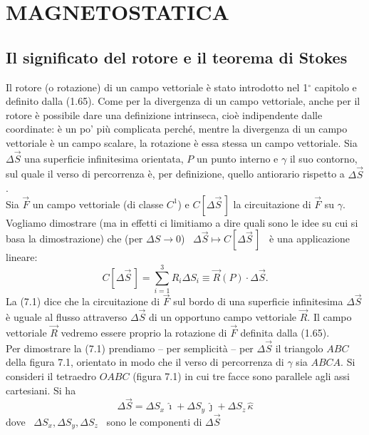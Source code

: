 \section{MAGNETOSTATICA}

\subsection{Il significato del rotore e il teorema di Stokes}

Il rotore (o rotazione) di un campo vettoriale \`e stato introdotto nel
1$^\circ$ capitolo e definito dalla (1.65). Come per la divergenza di un campo
vettoriale, anche per il rotore \`e possibile dare una definizione intrinseca,
cio\`e indipendente dalle coordinate: \`e un po' pi\`u complicata perch\'e,
mentre la divergenza di un campo vettoriale \`e un campo scalare, la rotazione
\`e essa stessa un campo vettoriale.
Sia $\Delta\vec S$ una superficie infinitesima orientata, $P$ un punto interno e
$\gamma$ il suo contorno, sul quale il verso di percorrenza \`e, per
definizione, quello antiorario rispetto a $\Delta\vec S$.\\
Sia $\vec F$ un campo vettoriale (di classe $C^1$) e $C[\Delta\vec S\,]$ la
circuitazione di $\vec F$ su $\gamma$. Vogliamo dimostrare (ma in effetti ci
limitiamo a dire quali sono le idee su cui si basa la dimostrazione) che (per
$\Delta S\to0$) \ $\Delta\vec S\mapsto C[\Delta\vec S\,]$ \ \`e una applicazione
lineare:
\begin{equation}
  C[\Delta\vec S\,]=\sum_{i=1}^3R_i\Delta S_i\equiv\vec R(P)\cdot\Delta\vec S.
  \tag{7.1}
\end{equation}
La (7.1) dice che la circuitazione di $\vec F$ sul bordo di una superficie
infinitesima $\Delta\vec S$ \`e uguale al flusso attraverso $\Delta\vec S$ di un
opportuno campo vettoriale $\vec R$. Il campo vettoriale $\vec R$ vedremo essere
proprio la rotazione di $\vec F$ definita dalla (1.65).\\
Per dimostrare la (7.1) prendiamo -- per semplicit\`a -- per $\Delta\vec S$ il
triangolo $ABC$ della figura 7.1, orientato in modo che il verso di percorrenza
di $\gamma$ sia $ABCA$. Si consideri il tetraedro $OABC$ (figura 7.1) in cui tre
facce sono parallele agli assi cartesiani. Si ha
\begin{equation}
  \Delta\vec S=\Delta S_x\,\hat\imath+\Delta S_y\,\hat\jmath
  +\Delta S_z\,\hat\kappa
  \tag{7.2}
\end{equation}
dove \ $\Delta S_x,\Delta S_y,\Delta S_z$ \ sono le componenti di $\Delta\vec S$
